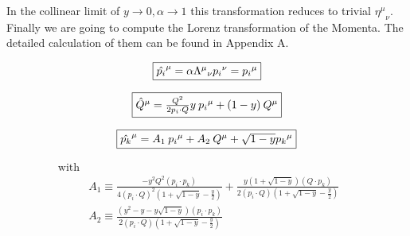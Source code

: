 In the collinear limit of $ y \rightarrow 0, \alpha \rightarrow 1 $
this transformation reduces to trivial $ {\eta^{\mu}}_{\nu} $.
Finally we are going to compute the Lorenz transformation of the Momenta. The detailed calculation of them can be found in Appendix A.

\begin{equation}
	\begin{aligned}
		\fbox{$  {\hat{{p_i}}}^{\mu}=\alpha{\Lambda^{\mu}}_{\nu} {p_i}^{\nu}= {p_i}^{\mu}$}
    \end{aligned}
\end{equation}

\begin{equation}
	\begin{aligned}
		\fbox{$  {\hat{{Q}}}^{\mu}= \frac{Q^2}{2p_i \cdot Q}y \:{p_i}^{\mu}+(1-y)\:{Q}^{\mu} $}
    \end{aligned}
\end{equation}

\begin{equation}
	\begin{aligned}
		\fbox{$  {\hat{{p_k}}}^{\mu}= A_1 \:{p_i}^{\mu}+A_2\:{Q}^{\mu}+\sqrt{1-y} {p_k}^{\mu} $}
    \end{aligned}
\end{equation}

\begin{equation*}
\begin{split}
\text{with}&\\
	&A_1 \equiv  \frac{-y^2 Q^2 (p_{i}\cdot {p_k})}{4(p_i\cdot Q)^2(1+\sqrt{1-y}-\frac{y}{2})}+ \frac{y(1+\sqrt{1-y})(Q \cdot {p_k})}{2(p_i\cdot Q)(1+\sqrt{1-y}-\frac{y}{2})}\\
		&A_2 \equiv   \frac{(y^2 -y-y\sqrt{1-y}) (p_{i}\cdot {p_k})}{2(p_i\cdot Q)(1+\sqrt{1-y}-\frac{y}{2})}\:\:\:\:\:\:\:\:\:\:\:\:\:\:\:\:\:\:\:\:\:\:\:\:\:\:\:\:\:\:\:\:\:\:\:\:\:\:\:\:\:\:\:\:\:\:\:\:\:\:\:\:\:\:\\\
\end{split}
\end{equation*}



